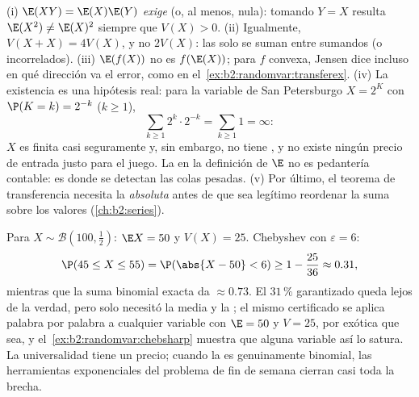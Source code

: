 \begin{remark}
(i) $\E(XY) = \E(X)\E(Y)$ \emph{exige}  (o, al menos,
 nula): tomando $Y = X$ resulta $\E(X^2) \neq \E(X)^2$
siempre que $V(X) > 0$. (ii) Igualmente, $V(X + X) = 4V(X)$, y no
$2V(X)$: las  solo se suman entre sumandos  (o
incorrelados). (iii) $\E(f(X))$ no es $f(\E(X))$; para $f$ convexa,
Jensen dice incluso en qué dirección va el error, como en el~\cref{ex:b2:randomvar:transferex}. (iv) La existencia es una
hipótesis real: para la variable de San Petersburgo $X = 2^K$ con
$\P(K = k) = 2^{-k}$ ($k \geq 1$),
\[
\sum_{k\geq1}2^k\cdot2^{-k} = \sum_{k\geq1}1 = \infty :
\]
$X$ es finita casi seguramente y, sin embargo, no tiene , y
no existe ningún precio de entrada justo para el juego. La
 en la definición de $\E$ no es pedantería contable: es
donde se detectan las colas pesadas. (v) Por último, el teorema de
transferencia necesita la  \emph{absoluta} antes de que
sea legítimo reordenar la suma sobre los valores
(\cref{ch:b2:series}).
\end{remark}


\begin{example}\label{ex:b2:randomvar:hundredtosses}
Para $X \sim \mathcal B(100, \frac12)$: $\E X = 50$ y $V(X) = 25$.
Chebyshev con $\varepsilon = 6$:
\[
\P(45 \leq X \leq 55) = \P(\abs{X - 50} < 6)
\geq 1 - \frac{25}{36} \approx 0.31 ,
\]
mientras que la suma binomial exacta da $\approx 0.73$. El $31\,\%$
garantizado queda lejos de la verdad, pero solo necesitó la media y
la ; el mismo certificado se aplica palabra por palabra a
cualquier variable con $\E = 50$ y $V = 25$, por exótica que sea, y
el~\cref{ex:b2:randomvar:chebsharp} muestra que alguna variable así
lo satura. La universalidad tiene un precio; cuando la
 es genuinamente binomial, las herramientas exponenciales
del problema de fin de semana cierran casi toda la brecha.
\end{example}

